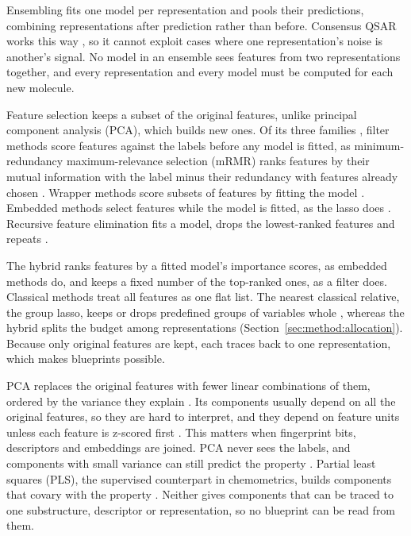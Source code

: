 


Ensembling fits one model per representation and pools their predictions, combining representations after prediction rather than before. Consensus QSAR works this way \citep{Valsecchi2020}, so it cannot exploit cases where one representation's noise is another's signal. No model in an ensemble sees features from two representations together, and every representation and every model must be computed for each new molecule.

Feature selection keeps a subset of the original features, unlike principal component analysis (PCA), which builds new ones. Of its three families \citep{Guyon2003}, filter methods score features against the labels before any model is fitted, as minimum-redundancy maximum-relevance selection (mRMR) ranks features by their mutual information with the label minus their redundancy with features already chosen \citep{Peng2005}. Wrapper methods score subsets of features by fitting the model \citep{Kohavi1997}. Embedded methods select features while the model is fitted, as the lasso does \citep{Tibshirani1996}. Recursive feature elimination fits a model, drops the lowest-ranked features and repeats \citep{Guyon2002}.

The hybrid ranks features by a fitted model's importance scores, as embedded methods do, and keeps a fixed number of the top-ranked ones, as a filter does. Classical methods treat all features as one flat list. The nearest classical relative, the group lasso, keeps or drops predefined groups of variables whole \citep{Yuan2006}, whereas the hybrid splits the budget among representations (Section~\ref{sec:method:allocation}). Because only original features are kept, each traces back to one representation, which makes blueprints possible.

PCA replaces the original features with fewer linear combinations of them, ordered by the variance they explain \citep{Jolliffe2016}. Its components usually depend on all the original features, so they are hard to interpret, and they depend on feature units unless each feature is z-scored first \citep{Jolliffe2016}. This matters when fingerprint bits, descriptors and embeddings are joined. PCA never sees the labels, and components with small variance can still predict the property \citep{Jolliffe1982}. Partial least squares (PLS), the supervised counterpart in chemometrics, builds components that covary with the property \citep{Wold2001}. Neither gives components that can be traced to one substructure, descriptor or representation, so no blueprint can be read from them.

